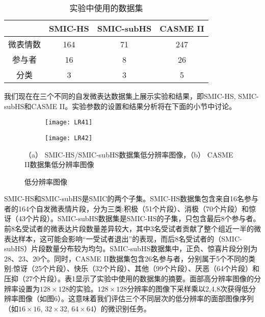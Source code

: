 \begin{table}[!htbp]
  \renewcommand\arraystretch{1.5}
  \centering
  \caption{实验中使用的数据集}
  \label{tab4}
  \begin{tabular}{c|ccc}
    \hline
    & SMIC-HS & SMIC-subHS & CASME II \\ \hline
    微表情数 & 164 & 71 & 247 \\
    参与者 & 16 & 8 & 26 \\
    分类 & 3 & 3 & 5 \\ \hline
  \end{tabular}
\end{table}

我们现在在三个不同的自发微表达数据集上展示实验和结果，即SMIC-HS, SMIC-subHS和CASME II。实验参数的设置和结果分析将在下面的小节中讨论。

\begin{figure}[!htbp]
    \centering
    \begin{subfigure}[b]{0.35\textwidth}
      \texttt{[image: LR41]}
      \caption{}
    \end{subfigure}
    \quad
    \begin{subfigure}[b]{0.35\textwidth}
      \texttt{[image: LR42]}
      \caption{}
    \end{subfigure}
    \begin{spacing}{1.0}
    \caption{低分辨率图像}
    \label{fig17}
    \centerline{\footnotesize \textmd{（a） SMIC-HS/SMIC-subHS数据集低分辨率图像，（b） CASME II数据集低分辨率图像}}
    \end{spacing}
\end{figure}

SMIC-HS和SMIC-subHS是SMIC的两个子集。SMIC-HS数据集包含来自16名参与者的164个自发微表情片段，分为三类:积极（51个片段）、消极（70个片段）和惊讶（43个片段）。SMIC-subHS数据集是SMIC-HS的子集，只包含最后8个参与者。前8名受试者的微表达片段数量差异较大，其中3名受试者贡献了整个组近一半的微表达样本，这可能会影响“一受试者退出”的表现，而后8名受试者的（SMIC-subHS）片段数量分布较为均匀。SMIC-subHS数据集中，正负、惊喜片段分别为28、23、20个。同时，CASME II数据集包含26名参与者，分别属于5个不同的类别:惊讶（25个片段）、快乐（32个片段）、其他（99个片段）、厌恶（64个片段）和压抑（27个片段）。表1显示了实验中使用的数据集的摘要。面部高分辨率图像的分辨率设置为$ 128 \times 128 $的实验。$ 128 \times 128 $分辨率的图像下采样乘以2,4,8次获得低分辨率图像（如图6）。这意味着我们评估三个不同层次的低分辨率的面部图像序列（如$ 16 \times 16 $, $ 32 \times 32 $, $ 64 \times 64 $）的微识别任务。

